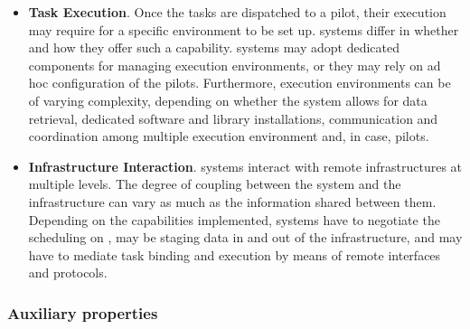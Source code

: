 \documentclass{sig-alternate}
\begin{document}
\begin{itemize}
\item \textbf{Task Execution}. Once the tasks are dispatched to a pilot, their
  execution may require for a specific environment to be set up. \pilot systems
  differ in whether and how they offer such a capability. \pilot systems may
  adopt dedicated components for managing execution environments, or they may
  rely on ad hoc configuration of the pilots. Furthermore, execution
  environments can be of varying complexity, depending on whether the \pilot
  system allows for data retrieval, dedicated software and library
  installations, communication and coordination among multiple execution
  environment and, in case, pilots.


\item \textbf{Infrastructure Interaction}. \pilot systems interact with remote
  infrastructures at multiple levels. The degree of coupling between the \pilot
  system and the infrastructure can vary as much as the information shared
  between them. Depending on the capabilities implemented, \pilot systems have
  to negotiate the scheduling on \pilots, may be staging data in and out of the
  infrastructure, and may have to mediate task binding and execution by means
  of remote interfaces and protocols.



\end{itemize}


\subsubsection{Auxiliary properties}
\label{sec:auxprops}
\end{document}

